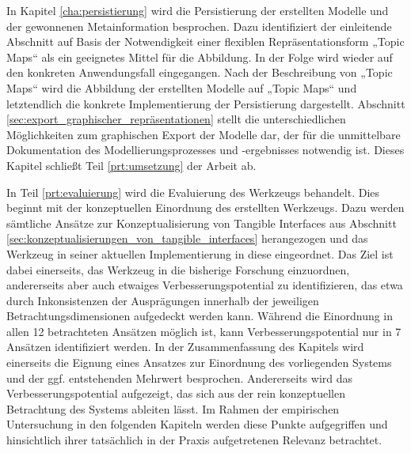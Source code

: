 In Kapitel \ref{cha:persistierung} wird die Persistierung der erstellten Modelle und der gewonnenen Metainformation besprochen. Dazu identifiziert der einleitende Abschnitt auf Basis der Notwendigkeit einer flexiblen Repräsentationsform „Topic Maps“ als ein geeignetes Mittel für die Abbildung. In der Folge wird  wieder auf den konkreten Anwendungsfall eingegangen. Nach der Beschreibung von „Topic Maps“ wird die Abbildung der erstellten Modelle auf „Topic Maps“ und letztendlich die konkrete Implementierung der Persistierung dargestellt. Abschnitt \ref{sec:export_graphischer_repräsentationen} stellt die unterschiedlichen Möglichkeiten zum graphischen Export der Modelle dar, der für die unmittelbare Dokumentation des Modellierungsprozesses und -ergebnisses notwendig ist. Dieses Kapitel schließt Teil \ref{prt:umsetzung} der Arbeit ab.

In Teil \ref{prt:evaluierung} wird die Evaluierung des Werkzeugs behandelt. Dies beginnt mit der konzeptuellen Einordnung des erstellten Werkzeugs. Dazu werden sämtliche Ansätze zur Konzeptualisierung von Tangible Interfaces aus Abschnitt \ref{sec:konzeptualisierungen_von_tangible_interfaces} herangezogen und das Werkzeug in seiner aktuellen Implementierung in diese eingeordnet. Das Ziel ist dabei einerseits, das Werkzeug in die bisherige Forschung einzuordnen, andererseits aber auch etwaiges Verbesserungspotential zu identifizieren, das etwa durch Inkonsistenzen der Ausprägungen innerhalb der jeweiligen Betrachtungsdimensionen aufgedeckt werden kann. Während die Einordnung in allen 12 betrachteten Ansätzen möglich ist, kann Verbesserungspotential nur in 7 Ansätzen identifiziert werden. In der Zusammenfassung des Kapitels wird einerseits die Eignung eines Ansatzes zur Einordnung des vorliegenden Systems und der ggf. entstehenden Mehrwert besprochen. Andererseits wird das Verbesserungspotential aufgezeigt, das sich aus der rein konzeptuellen Betrachtung des Systems ableiten lässt. Im Rahmen der empirischen Untersuchung in den folgenden Kapiteln werden diese Punkte aufgegriffen und hinsichtlich ihrer tatsächlich in der Praxis aufgetretenen Relevanz betrachtet.

